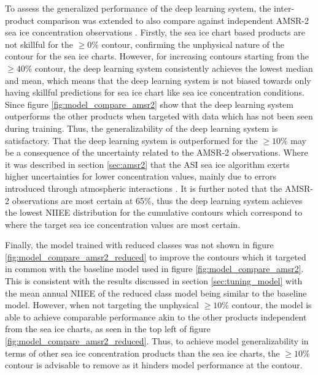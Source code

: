 \documentclass[../main/thesis]{subfiles}
\begin{document}
To assess the generalized performance of the deep learning system, the inter-product comparison was extended to also compare against independent AMSR-2 sea ice concentration observations \citep{Spreen2008}. Firstly, the sea ice chart based products are not skillful for the $\geq0\%$ contour, confirming the unphysical nature of the contour for the sea ice charts. However, for increasing contours starting from the $\geq40\%$ contour, the deep learning system consistently achieves the lowest median and mean, which means that the deep learning system is not biased towards only having skillful predictions for sea ice chart like sea ice concentration conditions. Since figure \ref{fig:model_compare_amsr2} show that the deep learning system outperforms the other products when targeted with data which has not been seen during training. Thus, the generalizability of the deep learning system is satisfactory. That the deep learning system is outperformed for the $\geq10\%$ may be a consequence of the uncertainty related to the AMSR-2 observations. Where it was described in section \ref{sec:amsr2} that the ASI sea ice algorithm exerts higher uncertainties for lower concentration values, mainly due to errors introduced through atmospheric interactions \citep{Spreen2008}. It is further noted that the AMSR-2 observations are most certain at 65\%, thus the deep learning system achieves the lowest NIIEE distribution for the cumulative contours which correspond to where the target sea ice concentration values are most certain.

Finally, the model trained with reduced classes was not shown in figure \ref{fig:model_compare_amsr2_reduced} to improve the contours which it targeted in common with the baseline model used in figure \ref{fig:model_compare_amsr2}. This is consistent with the results discussed in section \ref{sec:tuning_model} with the mean annual NIIEE of the reduced class model being similar to the baseline model. However, when not targeting the unphysical $\geq10\%$ contour, the model is able to achieve comparable performance akin to the other products independent from the sea ice charts, as seen in the top left of figure \ref{fig:model_compare_amsr2_reduced}. Thus, to achieve model generalizability in terms of other sea ice concentration products than the sea ice charts, the $\geq10\%$ contour is advisable to remove as it hinders model performance at the contour.
\end{document}
